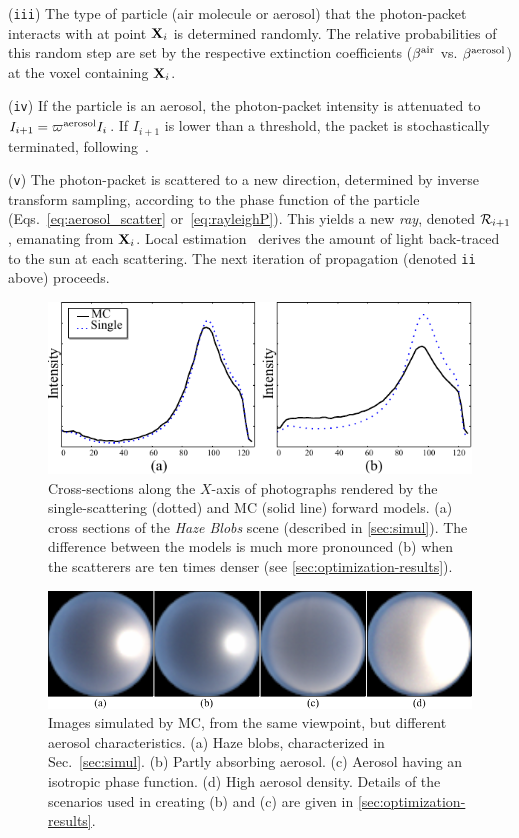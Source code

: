 \documentclass[10pt,letterpaper]{article}
\newcommand{\yoavcomment}[1]{}
\renewcommand{\yoavcomment}[1]{#1} %
\begin{document}
\noindent ({\tt iii}) The type of particle (air molecule or aerosol)
that the photon-packet interacts with at point ${\bf X}_{i}$ is determined
randomly. The relative probabilities of this random step are set by the respective extinction coefficients
($\beta^{\rm air}$ vs. $\beta^{\rm aerosol}$) at the voxel containing ${\bf X}_{i}$.


\noindent ({\tt iv}) If the particle is an aerosol, the photon-packet intensity
is attenuated to $I_{i+1}=\varpi^{\rm aerosol}I_{i}$. If $I_{i+1}$ is
lower than a threshold, the packet is stochastically terminated,
following~\cite{Iwabuchi2006}.

\noindent ({\tt v}) The photon-packet is scattered to a new direction,
determined by inverse transform sampling, according to the phase
function of the particle (Eqs.~\ref{eq:aerosol_scatter}
or~\ref{eq:rayleighP}). This yields a new {\em ray}, denoted ${\cal
  R}_{i+1}$, emanating from ${\bf X}_{i}$. Local
estimation~\cite{marshak20053d} derives the amount of
light back-traced to the sun at each scattering. The next iteration of
propagation (denoted {\tt ii} above) proceeds.
\begin{figure}[t]
  \centering
  \yoavcomment{\includegraphics{images/cross_sections.pdf}}
  \caption{\small Cross-sections along the $X$-axis of photographs rendered
    by the single-scattering (dotted) and MC (solid line) forward models.
    (a) cross sections of the {\em Haze Blobs} scene (described in \cref{sec:simul}).
    The difference between the models is much more pronounced (b) 
    when the scatterers are ten times denser (see \cref{sec:optimization-results}).
  }
  \label{fig:cross_sections}
\end{figure}
\begin{figure}[b]
  \centering
  \yoavcomment{\includegraphics{images/simulation_particles.pdf}}
  \caption{\small Images simulated by MC, from the same viewpoint, but different
  aerosol characteristics. (a) Haze blobs, characterized in Sec.~\ref{sec:simul}. 
  (b) Partly absorbing aerosol. (c) Aerosol having an isotropic phase function.
  (d) High aerosol density. Details of the scenarios used in creating (b) and
  (c) are given in \cref{sec:optimization-results}.}
  \label{fig:simulation_particles}
\end{figure}
\end{document}
